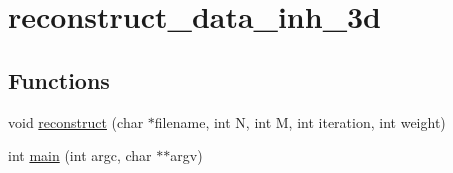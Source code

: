 \hypertarget{group__applications__mri2d__reconstruct__data__inh__3d}{
\section{reconstruct\_\-data\_\-inh\_\-3d}
\label{group__applications__mri2d__reconstruct__data__inh__3d}
}
\subsection*{Functions}
\begin{CompactItemize}
\item 
\hypertarget{group__applications__mri2d__reconstruct__data__inh__3d_g43c01bb9865574fcfee9a1f999713987}{
void \hyperlink{group__applications__mri2d__reconstruct__data__inh__3d_g43c01bb9865574fcfee9a1f999713987}{reconstruct} (char $\ast$filename, int N, int M, int iteration, int weight)}
\label{group__applications__mri2d__reconstruct__data__inh__3d_g43c01bb9865574fcfee9a1f999713987}

\item 
\hypertarget{group__applications__mri2d__reconstruct__data__inh__3d_g3c04138a5bfe5d72780bb7e82a18e627}{
int \hyperlink{group__applications__mri2d__reconstruct__data__inh__3d_g3c04138a5bfe5d72780bb7e82a18e627}{main} (int argc, char $\ast$$\ast$argv)}
\label{group__applications__mri2d__reconstruct__data__inh__3d_g3c04138a5bfe5d72780bb7e82a18e627}

\end{CompactItemize}
